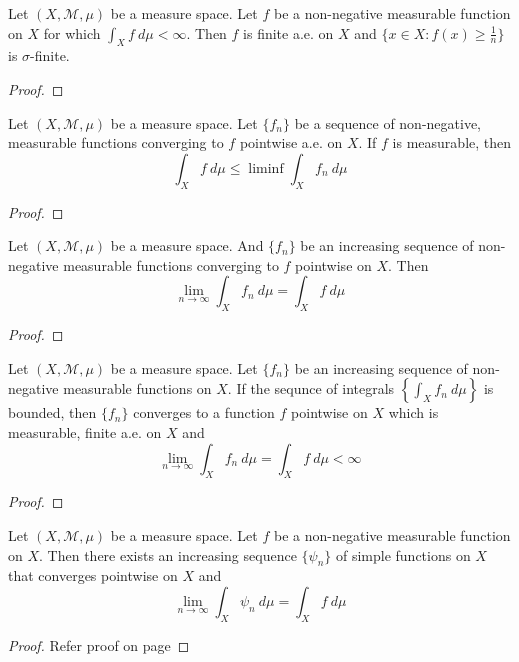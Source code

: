 \begin{theorem}
	Let $(X,\mathcal{M},\mu)$ be a measure space.
	Let $f$ be a non-negative measurable function on $X$ for which $\int_X f \ d\mu < \infty$.
	Then $f$ is finite a.e. on $X$ and $\{ x \in X : f(x) \ge \frac{1}{n}\}$ is $\sigma$-finite.
\end{theorem}
\begin{proof}
\end{proof}

\begin{lemma}[Fatou]
	Let $(X,\mathcal{M},\mu)$ be a measure space.
	Let $\{ f_n \}$ be a sequence of non-negative, measurable functions converging to $f$ pointwise a.e. on $X$.
	If $f$ is measurable, then
	\[ \int_X f\ d\mu \le \liminf \int_X f_n \ d\mu \]
\end{lemma}
\begin{proof}
\end{proof}

\begin{theorem}
	Let $(X,\mathcal{M},\mu)$ be a measure space.
	And $\{ f_n \}$ be an increasing sequence of non-negative measurable functions converging to $f$ pointwise on $X$.
	Then
	\[ \lim_{n \to \infty} \int_X f_n \ d\mu = \int_X f\ d\mu \]
\end{theorem}
\begin{proof}
\end{proof}

\begin{lemma}
	Let $(X,\mathcal{M},\mu)$ be a measure space.
	Let $\{ f_n \}$ be an increasing sequence of non-negative measurable functions on $X$.
	If the sequnce of integrals $\displaystyle \left\{ \int_X f_n \ d\mu \right\}$ is bounded, then $\{ f_n \}$ converges to a function $f$ pointwise on $X$ which is measurable, finite a.e. on $X$ and 
	\[ \lim_{n \to \infty} \int_X f_n \ d\mu = \int_X f \ d\mu < \infty \]
\end{lemma}
\begin{proof}
\end{proof}

\begin{theorem}
	Let $(X,\mathcal{M},\mu)$ be a measure space.
	Let $f$ be a non-negative measurable function on $X$.
	Then there exists an increasing sequence $\{ \psi_n \}$ of simple functions on $X$ that converges pointwise on $X$ and 
	\[ \lim_{n \to \infty} \int_X \psi_n \ d\mu = \int_X f \ d\mu \]
\end{theorem}
\begin{proof}
	Refer proof on page \pageref{thm:simpleapproximation}
\end{proof}

